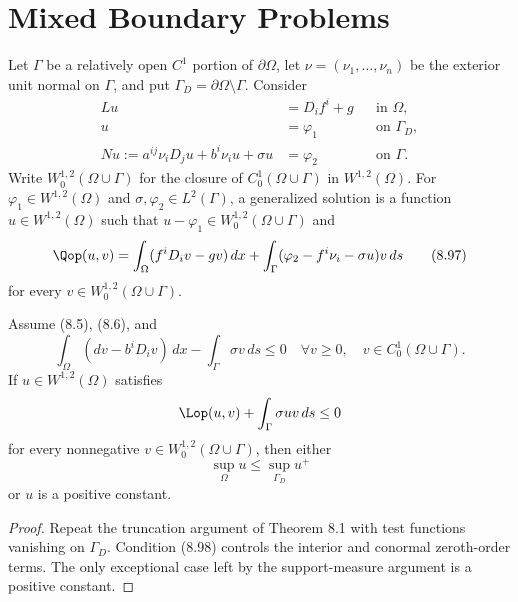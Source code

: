 \section*{Mixed Boundary Problems}

\begin{definition}
\label{gt-def-8-generalized-mixed-boundary-problem}
Let $\Gamma$ be a relatively open $C^1$ portion of $\partial\Omega$, let
$\nu=(\nu_1,\ldots,\nu_n)$ be the exterior unit normal on $\Gamma$, and put
$\Gamma_D=\partial\Omega\setminus\Gamma$. Consider
\begin{equation}
\begin{aligned}
Lu&=D_if^i+g &&\text{in }\Omega,\\
u&=\varphi_1 &&\text{on }\Gamma_D,\\
Nu:=a^{ij}\nu_iD_ju+b^i\nu_i u+\sigma u&=\varphi_2
&&\text{on }\Gamma.
\end{aligned}
\tag{8.96}
\end{equation}
Write $W_0^{1,2}(\Omega\cup\Gamma)$ for the closure of
$C_0^1(\Omega\cup\Gamma)$ in $W^{1,2}(\Omega)$. For
$\varphi_1\in W^{1,2}(\Omega)$ and $\sigma,\varphi_2\in L^2(\Gamma)$, a
generalized solution is a function $u\in W^{1,2}(\Omega)$ such that
$u-\varphi_1\in W_0^{1,2}(\Omega\cup\Gamma)$ and
\begin{equation}
\Qop(u,v)=\int_\Omega(f^iD_iv-gv)\,dx
+\int_\Gamma(\varphi_2-f^i\nu_i-\sigma u)v\,ds
\tag{8.97}
\end{equation}
for every $v\in W_0^{1,2}(\Omega\cup\Gamma)$.
\end{definition}

\begin{theorem}
\label{gt-thm-8-mixed-boundary-maximum-principle}
Assume (8.5), (8.6), and
\begin{equation}
\int_\Omega(dv-b^iD_iv)\,dx-\int_\Gamma\sigma v\,ds\leq0
\quad\forall v\geq0,\quad v\in C_0^1(\Omega\cup\Gamma).
\tag{8.98}
\end{equation}
If $u\in W^{1,2}(\Omega)$ satisfies
\[
\Lop(u,v)+\int_\Gamma\sigma uv\,ds\leq0
\]
for every nonnegative $v\in W_0^{1,2}(\Omega\cup\Gamma)$, then either
\[
\sup_\Omega u\leq\sup_{\Gamma_D}u^+
\]
or $u$ is a positive constant.
\end{theorem}
\begin{proof}
\sketch Repeat the truncation argument of Theorem 8.1 with test functions
vanishing on $\Gamma_D$. Condition (8.98) controls the interior and conormal
zeroth-order terms. The only exceptional case left by the support-measure
argument is a positive constant.
\end{proof}

